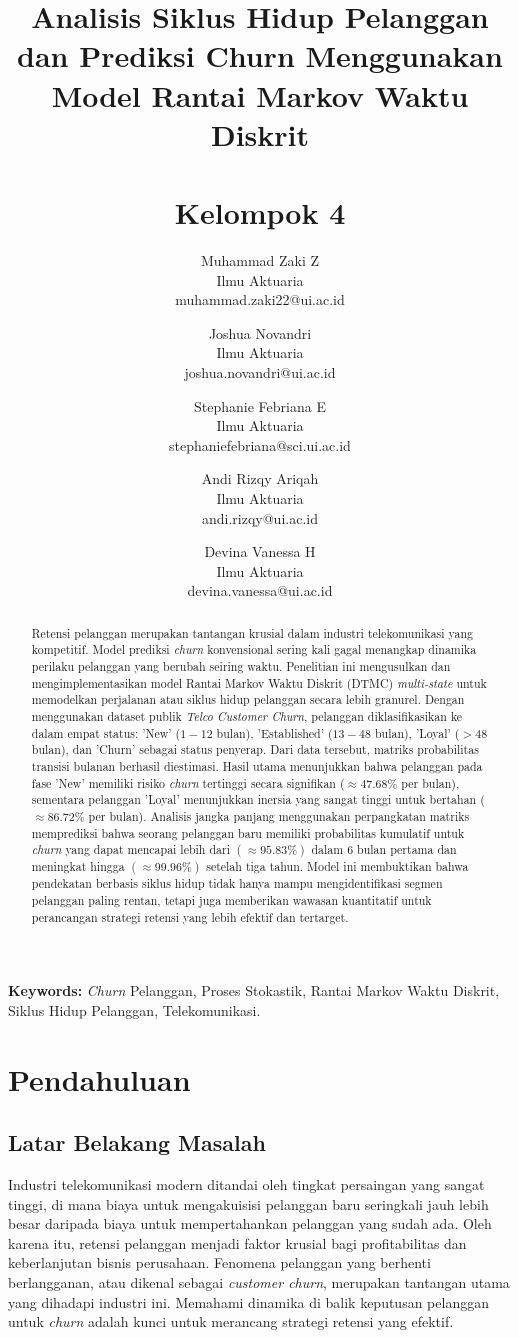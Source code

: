\documentclass[a4paper,12pt]{article}
\title{
\bf Analisis Siklus Hidup Pelanggan dan Prediksi Churn Menggunakan Model Rantai Markov Waktu Diskrit \\
\vspace{0.5em}\\
\large Kelompok 4
}
\author{
Muhammad Zaki Z \\
\small Ilmu Aktuaria \\
\small muhammad.zaki22@ui.ac.id
\and
Joshua Novandri \\
\small Ilmu Aktuaria \\
\small joshua.novandri@ui.ac.id
\and
Stephanie Febriana E\\
\small Ilmu Aktuaria \\
\small stephaniefebriana@sci.ui.ac.id
\and
Andi Rizqy Ariqah \\
\small Ilmu Aktuaria \\
\small andi.rizqy@ui.ac.id
\and
Devina Vanessa H \\
\small Ilmu Aktuaria \\
\small devina.vanessa@ui.ac.id
}
\begin{document}
\maketitle

\begin{abstract}
Retensi pelanggan merupakan tantangan krusial dalam industri telekomunikasi yang kompetitif. Model prediksi \textit{churn} konvensional sering kali gagal menangkap dinamika perilaku pelanggan yang berubah seiring waktu. Penelitian ini mengusulkan dan mengimplementasikan model Rantai Markov Waktu Diskrit (DTMC) \textit{multi-state} untuk memodelkan perjalanan atau siklus hidup pelanggan secara lebih granurel. Dengan menggunakan dataset publik \textit{Telco Customer Churn}, pelanggan diklasifikasikan ke dalam empat status: 'New' ($1-12$ bulan), 'Established' ($13-48$ bulan), 'Loyal' ($>48$ bulan), dan 'Churn' sebagai status penyerap. Dari data tersebut, matriks probabilitas transisi bulanan berhasil diestimasi. Hasil utama menunjukkan bahwa pelanggan pada fase 'New' memiliki risiko \textit{churn} tertinggi secara signifikan ($\approx 47.68\%$ per bulan), sementara pelanggan 'Loyal' menunjukkan inersia yang sangat tinggi untuk bertahan ($\approx86.72\%$ per bulan). Analisis jangka panjang menggunakan perpangkatan matriks memprediksi bahwa seorang pelanggan baru memiliki probabilitas kumulatif untuk \textit{churn} yang dapat mencapai lebih dari $(\approx95.83\%)$ dalam 6 bulan pertama dan meningkat hingga $(\approx99.96\%)$ setelah tiga tahun. Model ini membuktikan bahwa pendekatan berbasis siklus hidup tidak hanya mampu mengidentifikasi segmen pelanggan paling rentan, tetapi juga memberikan wawasan kuantitatif untuk perancangan strategi retensi yang lebih efektif dan tertarget.
\end{abstract}


\noindent\textbf{Keywords:} \textit{Churn} Pelanggan, Proses Stokastik, Rantai Markov Waktu Diskrit, Siklus Hidup Pelanggan, Telekomunikasi.


\section{Pendahuluan}

\subsection{Latar Belakang Masalah}
Industri telekomunikasi modern ditandai oleh tingkat persaingan yang sangat tinggi, di mana biaya untuk mengakuisisi pelanggan baru seringkali jauh lebih besar daripada biaya untuk mempertahankan pelanggan yang sudah ada. Oleh karena itu, retensi pelanggan menjadi faktor krusial bagi profitabilitas dan keberlanjutan bisnis perusahaan. Fenomena pelanggan yang berhenti berlangganan, atau dikenal sebagai \textit{customer churn}, merupakan tantangan utama yang dihadapi industri ini. Memahami dinamika di balik keputusan pelanggan untuk \textit{churn} adalah kunci untuk merancang strategi retensi yang efektif.
\end{document}
